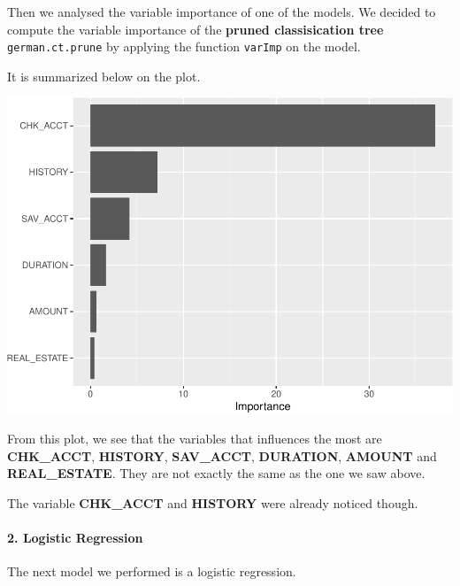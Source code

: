 \documentclass[
]{article}
\begin{document}
Then we analysed the variable importance of one of the models. We
decided to compute the variable importance of the \textbf{pruned
classisication tree} \texttt{german.ct.prune} by applying the function
\texttt{varImp} on the model.

It is summarized below on the plot.

\begin{center}\includegraphics{report_files/figure-latex/unnamed-chunk-36-1} \end{center}

From this plot, we see that the variables that influences the most are
\textbf{CHK\_ACCT}, \textbf{HISTORY}, \textbf{SAV\_ACCT},
\textbf{DURATION}, \textbf{AMOUNT} and \textbf{REAL\_ESTATE}. They are
not exactly the same as the one we saw above.

The variable \textbf{CHK\_ACCT} and \textbf{HISTORY} were already
noticed though.

\hypertarget{logistic-regression}{%
\paragraph{2. Logistic Regression}\label{logistic-regression}}

The next model we performed is a logistic regression.
\end{document}
